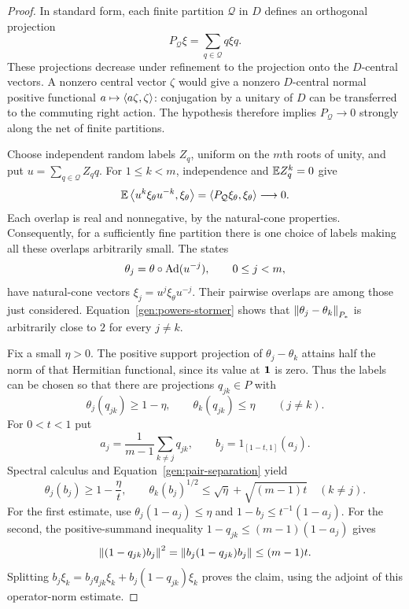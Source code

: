 \begin{proof}
In standard form, each finite partition $\mathcal Q$ in $D$ defines
an orthogonal projection
\[
 P_{\mathcal Q}\xi=\sum_{q\in\mathcal Q}q\xi q.
\]
These projections decrease under refinement to the projection onto
the $D$-central vectors. A nonzero central vector $\zeta$ would give
a nonzero $D$-central normal positive functional
$a\mapsto\left\langle a\zeta,\zeta\right\rangle$: conjugation by a unitary of $D$ can be
transferred to the commuting right action. The hypothesis therefore
implies $P_{\mathcal Q}\to0$ strongly along the net of finite
partitions.

Choose independent random labels $Z_q$, uniform on the $m$th roots
of unity, and put $u=\sum_{q\in\mathcal Q}Z_q q$. For $1\leq k<m$,
independence and $\mathbb E Z_q^k=0$ give
\[
 \mathbb E\left\langle u^k\xi_\theta u^{-k},\xi_\theta\right\rangle
   =\left\langle P_{\mathcal Q}\xi_\theta,\xi_\theta\right\rangle
   \longrightarrow0.
\]
Each overlap is real and nonnegative, by the natural-cone properties.
Consequently, for a sufficiently fine partition there is one choice
of labels making all these overlaps arbitrarily small. The states
\[
 \theta_j=\theta\circ\operatorname{Ad}(u^{-j}),\qquad 0\leq j<m,
\]
have natural-cone vectors $\xi_j=u^j\xi_\theta u^{-j}$. Their pairwise
overlaps are among those just considered. Equation~\eqref{gen:powers-stormer}
shows that $\left\lVert\theta_j-\theta_k\right\rVert_{P_*}$ is arbitrarily close to
$2$ for every $j\ne k$.

Fix a small $\eta>0$. The positive support projection of
$\theta_j-\theta_k$ attains half the norm of that Hermitian
functional, since its value at $\mathbf 1$ is zero. Thus the labels can
be chosen so that there are projections $q_{jk}\in P$ with
\begin{equation}\label{gen:pair-separation}
 \theta_j(q_{jk})\geq1-\eta,\qquad
 \theta_k(q_{jk})\leq\eta\qquad(j\ne k).
\end{equation}
For $0<t<1$ put
\[
 a_j=\frac1{m-1}\sum_{k\ne j}q_{jk},\qquad
 b_j=1_{[1-t,1]}(a_j).
\]
Spectral calculus and Equation~\eqref{gen:pair-separation} yield
\begin{equation}\label{gen:spectral-separation}
 \theta_j(b_j)\geq1-\frac\eta t,\qquad
 \theta_k(b_j)^{1/2}\leq\sqrt\eta+\sqrt{(m-1)t}\quad(k\ne j).
\end{equation}
For the first estimate, use $\theta_j(1-a_j)\leq\eta$ and
$1-b_j\leq t^{-1}(1-a_j)$. For the second, the positive-summand
inequality $1-q_{jk}\leq(m-1)(1-a_j)$ gives
\[
 \left\lVert(1-q_{jk})b_j\right\rVert^2
   =\left\lVert b_j(1-q_{jk})b_j\right\rVert\leq(m-1)t.
\]
Splitting $b_j\xi_k=b_jq_{jk}\xi_k+b_j(1-q_{jk})\xi_k$ proves
the claim, using the adjoint of this operator-norm estimate.


\end{proof}
